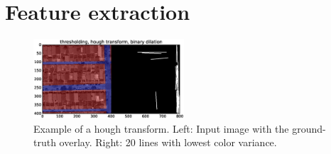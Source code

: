 \documentclass[10pt,conference,compsocconf]{IEEEtran}
\begin{document}
\section{Feature extraction}

\begin{figure}[htb]
\centering
\includegraphics[width=0.5\textwidth]{pics/ex_hough.eps}
\caption{\label{fig:hough}
Example of a hough transform. Left: Input image with the ground-truth overlay. Right: 20 lines with lowest color variance.}
\end{figure}
\end{document}
